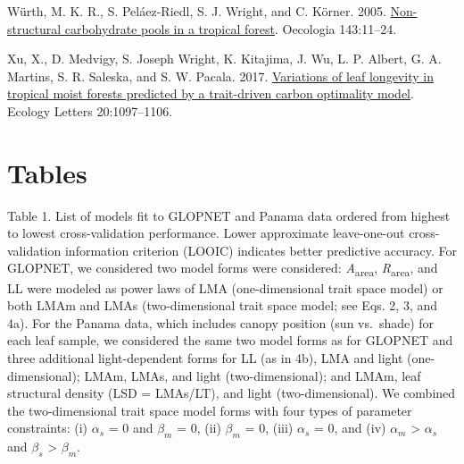 \documentclass[
  12pt,
  letterpaper,
  DIV=11,
  numbers=noendperiod]{scrartcl}
\newlength{\cslhangindent}
\newlength{\cslentryspacingunit} %
\newenvironment{CSLReferences}[2] %
 {%
  \setlength{\parindent}{0pt}
  \ifodd #1
  \let\oldpar\par
  \def\par{\hangindent=\cslhangindent\oldpar}
  \fi
  \setlength{\parskip}{#2\cslentryspacingunit}
 }%
 {}
\begin{document}
\begin{CSLReferences}{1}{0}
\leavevmode{}%
Würth, M. K. R., S. Peláez-Riedl, S. J. Wright, and C. Körner. 2005.
\href{https://doi.org/10.1007/s00442-004-1773-2}{Non-structural
carbohydrate pools in a tropical forest}. Oecologia 143:11--24.

\leavevmode{}%
Xu, X., D. Medvigy, S. Joseph Wright, K. Kitajima, J. Wu, L. P. Albert,
G. A. Martins, S. R. Saleska, and S. W. Pacala. 2017.
\href{https://doi.org/10.1111/ele.12804}{Variations of leaf longevity in
tropical moist forests predicted by a trait-driven carbon optimality
model}. Ecology Letters 20:1097--1106.

\end{CSLReferences}

\newpage

\hypertarget{tables}{%
\section{Tables}\label{tables}}

Table 1. List of models fit to GLOPNET and Panama data ordered from
highest to lowest cross-validation performance. Lower approximate
leave-one-out cross-validation information criterion (LOOIC) indicates
better predictive accuracy. For GLOPNET, we considered two model forms
were considered: \emph{A}\textsubscript{area},
\emph{R}\textsubscript{area}, and LL were modeled as power laws of LMA
(one-dimensional trait space model) or both LMAm and LMAs
(two-dimensional trait space model; see Eqs. 2, 3, and 4a). For the
Panama data, which includes canopy position (sun vs.~shade) for each
leaf sample, we considered the same two model forms as for GLOPNET and
three additional light-dependent forms for LL (as in 4b), LMA and light
(one-dimensional); LMAm, LMAs, and light (two-dimensional); and LMAm,
leaf structural density (LSD = LMAs/LT), and light (two-dimensional). We
combined the two-dimensional trait space model forms with four types of
parameter constraints: (i) \(\alpha_s\) = 0 and \(\beta_m\) = 0, (ii)
\(\beta_m\) = 0, (iii) \(\alpha_s\) = 0, and (iv) \(\alpha_m\)
\textgreater{} \(\alpha_s\) and \(\beta_s\) \textgreater{} \(\beta_m\).
\end{document}
